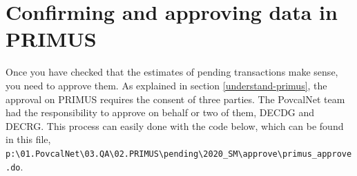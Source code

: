 \documentclass[
]{book}
\begin{document}
\hypertarget{approve-primus}{%
\section{Confirming and approving data in PRIMUS}\label{approve-primus}}

Once you have checked that the estimates of pending transactions make sense, you
need to approve them. As explained in section \ref{understand-primus}, the
approval on PRIMUS requires the consent of three parties. The PovcalNet team had
the responsibility to approve on behalf or two of them, DECDG and DECRG. This
process can easily done with the code below, which can be found in this file,
\texttt{p:\textbackslash{}01.PovcalNet\textbackslash{}03.QA\textbackslash{}02.PRIMUS\textbackslash{}pending\textbackslash{}2020\_SM\textbackslash{}approve\textbackslash{}primus\_approve.do}.
\end{document}
